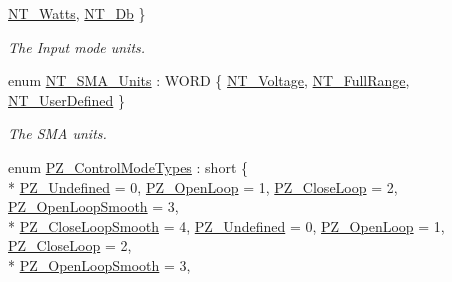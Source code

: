 \begin{DoxyCompactItemize}
\hyperlink{group___common_gga019e1d6ab2bfe02c9351c8c5a5a9500ea42b4bca2a1ae957048214e5ad6223f30}{N\+T\+\_\+\+Watts}, 
\hyperlink{group___common_gga019e1d6ab2bfe02c9351c8c5a5a9500ea6c4faddd403ad645f4897c7fa29565a0}{N\+T\+\_\+\+Db}
 \}\begin{DoxyCompactList}\small\item\em The Input mode units. \end{DoxyCompactList}
\item 
enum \hyperlink{group___common_ga6fd42965a39f2811f13daeb08ca98683}{N\+T\+\_\+\+S\+M\+A\+\_\+\+Units} \+: W\+O\+RD \{ \hyperlink{group___common_gga6fd42965a39f2811f13daeb08ca98683af28eb0d0a4246c6dadbedfbd3a3f1aa7}{N\+T\+\_\+\+Voltage}, 
\hyperlink{group___common_gga6fd42965a39f2811f13daeb08ca98683a66ab2cdd068c81a368ed72184a63aff6}{N\+T\+\_\+\+Full\+Range}, 
\hyperlink{group___common_gga6fd42965a39f2811f13daeb08ca98683a140a34735759b6f38b5f6bab1e0990f1}{N\+T\+\_\+\+User\+Defined}
 \}\begin{DoxyCompactList}\small\item\em The S\+MA units. \end{DoxyCompactList}
\item 
enum \hyperlink{group___common_gaa4ff718266308759b2633c56c9a813b1}{P\+Z\+\_\+\+Control\+Mode\+Types} \+: short \{ \\*
\hyperlink{group___common_ggaa4ff718266308759b2633c56c9a813b1a27fa48faa859be560d4a23edd493a730}{P\+Z\+\_\+\+Undefined} = 0, 
\hyperlink{group___common_ggaa4ff718266308759b2633c56c9a813b1a2f2a5e97904da9ce5a640e1f08811fa6}{P\+Z\+\_\+\+Open\+Loop} = 1, 
\hyperlink{group___common_ggaa4ff718266308759b2633c56c9a813b1a8d01c0eb90001b416b7287dda9902f43}{P\+Z\+\_\+\+Close\+Loop} = 2, 
\hyperlink{group___common_ggaa4ff718266308759b2633c56c9a813b1a0534af989fbfef682192fc10a41f3aa9}{P\+Z\+\_\+\+Open\+Loop\+Smooth} = 3, 
\\*
\hyperlink{group___common_ggaa4ff718266308759b2633c56c9a813b1ac9c6d9fe59ecf67a3d4c39b21f2afcdf}{P\+Z\+\_\+\+Close\+Loop\+Smooth} = 4, 
\hyperlink{group___common_ggaa4ff718266308759b2633c56c9a813b1a27fa48faa859be560d4a23edd493a730}{P\+Z\+\_\+\+Undefined} = 0, 
\hyperlink{group___common_ggaa4ff718266308759b2633c56c9a813b1a2f2a5e97904da9ce5a640e1f08811fa6}{P\+Z\+\_\+\+Open\+Loop} = 1, 
\hyperlink{group___common_ggaa4ff718266308759b2633c56c9a813b1a8d01c0eb90001b416b7287dda9902f43}{P\+Z\+\_\+\+Close\+Loop} = 2, 
\\*
\hyperlink{group___common_ggaa4ff718266308759b2633c56c9a813b1a0534af989fbfef682192fc10a41f3aa9}{P\+Z\+\_\+\+Open\+Loop\+Smooth} = 3, 

\end{DoxyCompactItemize}
